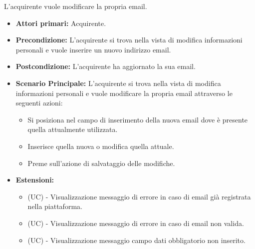 L'acquirente vuole modificare la propria email.
\begin{itemize}
    \item \textbf{Attori primari:} Acquirente.
    \item \textbf{Precondizione:} L'acquirente si trova nella vista di modifica informazioni personali e vuole inserire un nuovo indirizzo email.
    \item \textbf{Postcondizione:} L'acquirente ha aggiornato la sua email.
    \item \textbf{Scenario Principale:} L'acquirente si trova nella vista di modifica informazioni personali e vuole modificare la propria email attraverso le seguenti azioni:
        \begin{itemize}
            \item Si posiziona nel campo di inserimento della nuova email dove è presente quella attualmente utilizzata.
            \item Inserisce quella nuova o modifica quella attuale.
            \item Preme sull'azione di salvataggio delle modifiche.
        \end{itemize}
    \item \textbf{Estensioni:}
    \begin{itemize}
        \item (UC) - Visualizzazione messaggio di errore in caso di email già registrata nella piattaforma.
        \item (UC) - Visualizzazione messaggio di errore in caso di email non valida.
        \item (UC) - Visualizzazione messaggio campo dati obbligatorio non inserito.
    \end{itemize}
\end{itemize}

